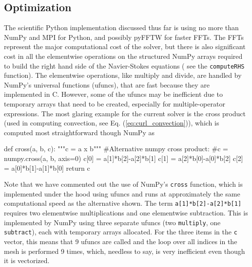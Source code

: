 \documentclass[final,3p,times,twocolumn]{elsarticle}
\newcommand{\inpyth}{\lstinline[style=inlinestyle]}
\begin{document}
\subsection{Optimization}
\label{sec:optimization}
The scientific Python implementation discussed thus far is using no more than 
NumPy and MPI for Python, and possibly pyFFTW for faster FFTs. The FFTs 
represent the major computational cost of the solver, but there is also 
significant cost in all the elementwise operations on the structured NumPy 
arrays required to build the right hand side of the Navier-Stokes equations (
see the \inpyth{computeRHS} function). The elementwise operations, like 
multiply 
and divide, are handled by NumPy's universal functions (ufuncs), that are fast 
because they are implemented in C. However, some of the ufuncs may be 
inefficient due to temporary arrays that need to be created, especially for 
multiple-operator expressions. The most glaring example for the current solver 
is the cross product (used in computing convection, see Eq. 
(\ref{eq:curl_convection})), which is computed most straightforward though 
NumPy as
\begin{python}
def cross(a, b, c):
    """c = a x b"""
    #Alternative numpy cross product:
    #c = numpy.cross(a, b, axis=0)
    c[0] = a[1]*b[2]-a[2]*b[1]
    c[1] = a[2]*b[0]-a[0]*b[2]
    c[2] = a[0]*b[1]-a[1]*b[0]
    return c
\end{python}
Note that we have commented out the use of NumPy's \inpyth{cross} function, 
which is implemented under the hood using ufuncs and runs at approximately the 
same computational speed as the alternative shown. The term 
\inpyth{a[1]*b[2]-a[2]*b[1]} requires two elementwise multiplications and one 
elementwise subtraction. This is implemented by NumPy using three separate 
ufuncs (two \inpyth{multiply}, one \inpyth{subtract}), each with temporary 
arrays allocated. For the three items in the \inpyth{c} vector, this means that 
9 ufuncs are called and the loop over all  indices in the mesh is 
performed 9 times, which, needless to say, is very inefficient even though it 
is vectorized.
\end{document}
